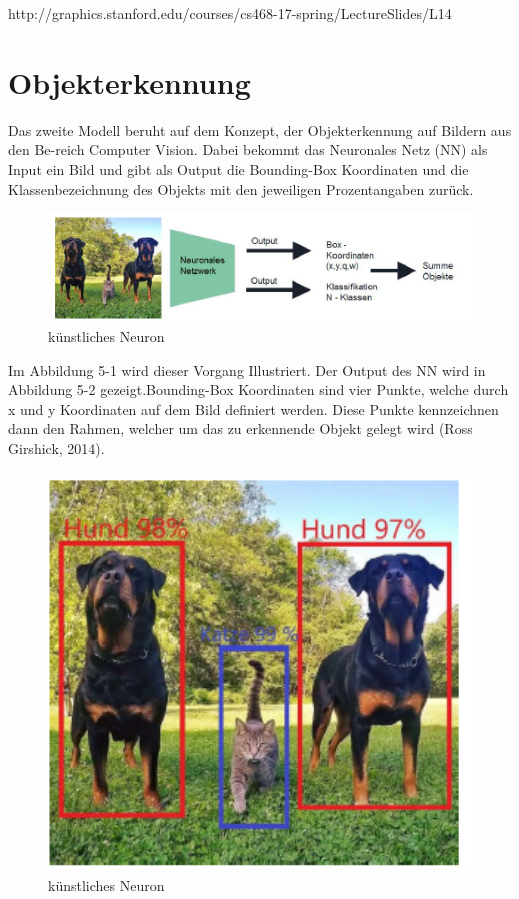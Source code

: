 \documentclass{llncs}
\begin{document}
http://graphics.stanford.edu/courses/cs468-17-spring/LectureSlides/L14%


\section{Objekterkennung}
Das zweite Modell beruht auf dem Konzept, der Objekterkennung auf Bildern aus den Be-reich Computer Vision. Dabei bekommt das Neuronales Netz (NN) als Input ein Bild und gibt als Output die Bounding-Box Koordinaten und die Klassenbezeichnung des Objekts mit den jeweiligen Prozentangaben zurück.
\begin{figure}[htbp] 
	\centering
	\includegraphics[width=1.0\textwidth]{objekterkennung1.png}
	\caption{künstliches Neuron}
	\label{fig:Bild1}
\end{figure}

 Im Abbildung 5-1 wird dieser Vorgang Illustriert. Der Output des NN wird in Abbildung 5-2 gezeigt.Bounding-Box Koordinaten sind vier Punkte, welche durch x und y Koordinaten auf dem Bild definiert werden. Diese Punkte kennzeichnen dann den Rahmen, welcher um das zu erkennende Objekt gelegt wird (Ross Girshick, 2014).
\begin{figure}[htbp] 
	\centering
	\includegraphics[width=1.0\textwidth]{objekterkennung2.png}
	\caption{künstliches Neuron}
	\label{fig:Bild1}
\end{figure}
 
\end{document}
